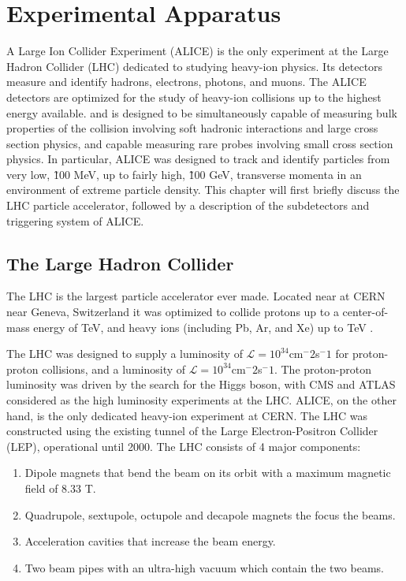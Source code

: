 \chapter{Experimental Apparatus} 

\degree
A Large Ion Collider Experiment (ALICE) is the only experiment at the Large Hadron Collider (LHC) dedicated to studying heavy-ion physics. Its detectors measure and identify hadrons, electrons, photons, and muons. The ALICE detectors are optimized for the study of heavy-ion collisions up to the highest energy available. and is designed to be simultaneously capable of measuring  bulk properties of the collision involving soft hadronic interactions and large cross section physics, and capable measuring rare probes involving small cross section physics. In particular, ALICE was designed to track and identify particles from very low,  \~100 MeV, up to fairly high, \~100 GeV, transverse momenta in an environment of extreme particle density. This chapter will first briefly discuss the LHC particle accelerator, followed by a description of the subdetectors and triggering system of ALICE.

\section{The Large Hadron Collider} 
\label{sec:LHC}
The LHC is the largest particle accelerator ever made. Located near at CERN near Geneva, Switzerland  it was optimized to collide protons up to a center-of-mass energy of  TeV, and heavy ions (including Pb, Ar, and Xe) up to  TeV \cite{Evans2008}.

The LHC was designed to supply a luminosity of $\mathcal{L}=10^{34}$cm$^-2$s$^-1$ for proton-proton collisions, and a luminosity of $\mathcal{L}=10^{34}$cm$^-2$s$^-1$. The proton-proton luminosity was driven by the search for the Higgs boson, with CMS and ATLAS considered as the high luminosity experiments at the LHC. ALICE, on the other hand, is the only dedicated heavy-ion experiment at CERN. The LHC was constructed using the existing tunnel of the Large Electron-Positron Collider (LEP), operational until 2000. The LHC consists of 4 major components:

\begin{enumerate}
	\item Dipole magnets that bend the beam on its orbit with a maximum magnetic field of 8.33 T. 
	\item Quadrupole, sextupole, octupole and decapole magnets the focus the beams.
	\item Acceleration cavities that increase the beam energy.
	\item Two beam pipes with an ultra-high vacuum  which contain the two beams.
\end{enumerate}

